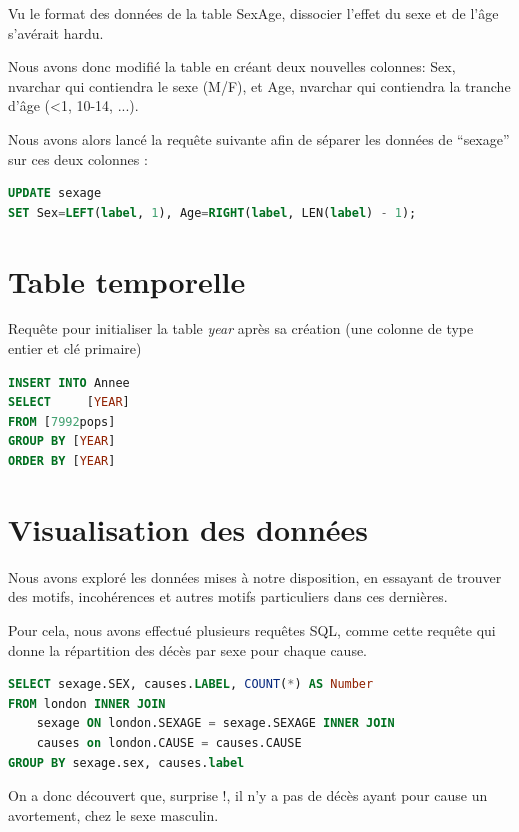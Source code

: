     Vu le format des données de la table SexAge, dissocier l'effet du sexe et de l'âge s'avérait hardu.

    Nous avons donc modifié la table en créant deux nouvelles colonnes: Sex, nvarchar qui contiendra le sexe (M/F), et Age,
    nvarchar qui contiendra la tranche d'âge (<1, 10-14, ...).

    Nous avons alors lancé la requête suivante afin de séparer les données de ``sexage'' sur ces deux colonnes :

    \begin{lstlisting}[frame=single, language=SQL]
UPDATE sexage
SET Sex=LEFT(label, 1), Age=RIGHT(label, LEN(label) - 1);
    \end{lstlisting}

\section{Table temporelle}

    Requête pour initialiser la table \textit{year} après sa création (une colonne de type entier et clé primaire)

    \begin{lstlisting}[frame=single, language=SQL]
INSERT INTO Annee
SELECT     [YEAR]
FROM [7992pops]
GROUP BY [YEAR]
ORDER BY [YEAR]
    \end{lstlisting}

\section{Visualisation des données}

    Nous avons exploré les données mises à notre disposition, en essayant de trouver des motifs, incohérences et autres motifs particuliers
    dans ces dernières.

    Pour cela, nous avons effectué plusieurs requêtes SQL, comme cette requête qui donne la répartition des décès par sexe pour chaque
    cause.

    \begin{lstlisting}[frame=single, language=SQL]
SELECT sexage.SEX, causes.LABEL, COUNT(*) AS Number
FROM london INNER JOIN
    sexage ON london.SEXAGE = sexage.SEXAGE INNER JOIN
    causes on london.CAUSE = causes.CAUSE
GROUP BY sexage.sex, causes.label
    \end{lstlisting}

    On a donc découvert que, surprise !, il n'y a pas de décès ayant pour cause un avortement, chez le sexe masculin.

